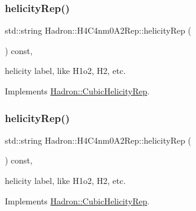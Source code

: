 \mbox{\label{structHadron_1_1H4C4nm0A2Rep_ac6d9fd3861fba10b770f3d953e748006}} 
\subsubsection{\texorpdfstring{helicityRep()}{helicityRep()}\hspace{0.1cm}{\footnotesize\ttfamily [1/2]}}
{\footnotesize\ttfamily std\+::string Hadron\+::\+H4\+C4nm0\+A2\+Rep\+::helicity\+Rep (\begin{DoxyParamCaption}{ }\end{DoxyParamCaption}) const\hspace{0.3cm}{\ttfamily [inline]}, {\ttfamily [virtual]}}

helicity label, like H1o2, H2, etc. 

Implements \mbox{\hyperlink{structHadron_1_1CubicHelicityRep_af1096946b7470edf0a55451cc662f231}{Hadron\+::\+Cubic\+Helicity\+Rep}}.

\mbox{\label{structHadron_1_1H4C4nm0A2Rep_ac6d9fd3861fba10b770f3d953e748006}} 
\subsubsection{\texorpdfstring{helicityRep()}{helicityRep()}\hspace{0.1cm}{\footnotesize\ttfamily [2/2]}}
{\footnotesize\ttfamily std\+::string Hadron\+::\+H4\+C4nm0\+A2\+Rep\+::helicity\+Rep (\begin{DoxyParamCaption}{ }\end{DoxyParamCaption}) const\hspace{0.3cm}{\ttfamily [inline]}, {\ttfamily [virtual]}}

helicity label, like H1o2, H2, etc. 

Implements \mbox{\hyperlink{structHadron_1_1CubicHelicityRep_af1096946b7470edf0a55451cc662f231}{Hadron\+::\+Cubic\+Helicity\+Rep}}.

\mbox{\label{structHadron_1_1H4C4nm0A2Rep_a8da7c1c6f969806290e6452367fce7ea}} 
